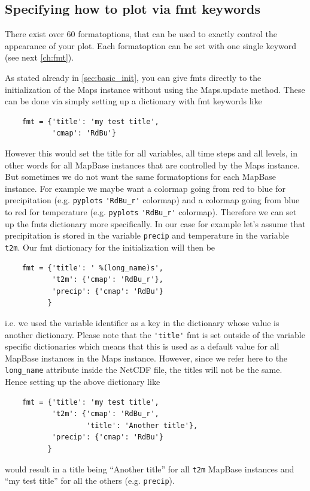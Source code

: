 \subsection{Specifying how to plot via \gls*{fmt} keywords}
There exist over 60 formatoptions, that can be used to exactly control the appearance of your plot. Each formatoption can be set with one single keyword (see next \autoref{ch:fmt}).

As stated already in \autoref{sec:basic_init}, you can give \glspl{fmt} directly to the initialization of the \gls{Maps} instance without using the \gls{Maps.update} method. These can be done via simply setting up a dictionary with \gls{fmt} keywords like
\begin{lstlisting}
	fmt = {'title': 'my test title',
	       'cmap': 'RdBu'}
\end{lstlisting}
However this would set the title for all variables, all time steps and all levels, in other words for all \gls{MapBase} instances that are controlled by the \gls{Maps} instance. But sometimes we do not want the same formatoptions for each \gls{MapBase} instance. For example we maybe want a colormap going from red to blue for precipitation (e.g. \lstinline|pyplots| \lstinline|'RdBu_r'| colormap) and a colormap going from blue to red for temperature (e.g. \lstinline|pyplots| \lstinline|'RdBu_r'| colormap). Therefore we can set up the \glspl{fmt} dictionary more specifically. In our case for example let's assume that precipitation is stored in the variable \lstinline|precip| and temperature in the variable \lstinline|t2m|. Our \gls{fmt} dictionary for the initialization will then be
\begin{lstlisting}
	fmt = {'title': ' %(long_name)s',
	       't2m': {'cmap': 'RdBu_r'},
	       'precip': {'cmap': 'RdBu'}
	      }
\end{lstlisting}
i.e. we used the variable identifier as a key in the  dictionary whose value is another  dictionary. Please note that the \lstinline|'title'| \gls{fmt} is set outside of the variable specific dictionaries which means that this is used as a default value for all \gls{MapBase} instances in the \gls{Maps} instance. However, since we refer here to the \lstinline|long_name| attribute inside the NetCDF file, the titles will not be the same. Hence setting up the above dictionary like
\begin{lstlisting}
	fmt = {'title': 'my test title',
	       't2m': {'cmap': 'RdBu_r',
	               'title': 'Another title'},
	       'precip': {'cmap': 'RdBu'}
	      }
\end{lstlisting}
would result in a title being \enquote{Another title} for all \lstinline|t2m| \gls{MapBase} instances and \enquote{my test title} for all the others (e.g. \lstinline|precip|).

